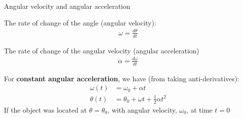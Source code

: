 \documentclass[aspectratio=169,
hyperref={colorlinks,urlcolor=blue}
]{beamer}
\begin{document}

\begin{bulletframe}{Angular velocity and angular acceleration}
\item<1-> The rate of change of the angle (angular velocity):
\begin{align*}
\omega = \frac{d\theta}{dt}
\end{align*}
\item<1-> The rate of change of the angular velocity (angular acceleration)
\begin{align*}
\alpha = \frac{d\omega}{dt}
\end{align*}
\item<2-> For \textbf{constant angular acceleration}, we have (from taking anti-derivatives):
\begin{align*}
\omega(t) &= \omega_0 + \alpha t\\
\theta(t) &= \theta_0+\omega t+\frac{1}{2}\alpha t^2
\end{align*}
If the object was located at $\theta =\theta_0$, with angular velocity, $\omega_0$, at time $t=0$
\end{bulletframe}


\end{document}
